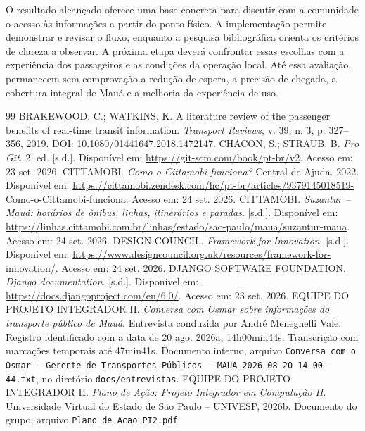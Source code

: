 \documentclass[12pt,oneside,a4paper,brazil]{abntex2}
\begin{document}
O resultado alcançado oferece uma base concreta para discutir com a comunidade o acesso às informações a partir do ponto físico. A implementação permite demonstrar e revisar o fluxo, enquanto a pesquisa bibliográfica orienta os critérios de clareza a observar. A próxima etapa deverá confrontar essas escolhas com a experiência dos passageiros e as condições da operação local. Até essa avaliação, permanecem sem comprovação a redução de espera, a precisão de chegada, a cobertura integral de Mauá e a melhoria da experiência de uso.

\postextual
\begin{thebibliography}{99}
\SingleSpacing
{} BRAKEWOOD, C.; WATKINS, K. A literature review of the passenger benefits of real-time transit information. \textit{Transport Reviews}, v. 39, n. 3, p. 327--356, 2019. DOI: 10.1080/01441647.2018.1472147.
 CHACON, S.; STRAUB, B. \textit{Pro Git}. 2. ed. [s.d.]. Disponível em: \url{https://git-scm.com/book/pt-br/v2}. Acesso em: 23 set. 2026.
 CITTAMOBI. \textit{Como o Cittamobi funciona?} Central de Ajuda. 2022. Disponível em: \url{https://cittamobi.zendesk.com/hc/pt-br/articles/9379145018519-Como-o-Cittamobi-funciona}. Acesso em: 24 set. 2026.
 CITTAMOBI. \textit{Suzantur -- Mauá: horários de ônibus, linhas, itinerários e paradas}. [s.d.]. Disponível em: \url{https://linhas.cittamobi.com.br/linhas/estado/sao-paulo/maua/suzantur-maua}. Acesso em: 24 set. 2026.
 DESIGN COUNCIL. \textit{Framework for Innovation}. [s.d.]. Disponível em: \url{https://www.designcouncil.org.uk/resources/framework-for-innovation/}. Acesso em: 24 set. 2026.
 DJANGO SOFTWARE FOUNDATION. \textit{Django documentation}. [s.d.]. Disponível em: \url{https://docs.djangoproject.com/en/6.0/}. Acesso em: 23 set. 2026.
 EQUIPE DO PROJETO INTEGRADOR II. \textit{Conversa com Osmar sobre informações do transporte público de Mauá}. Entrevista conduzida por André Meneghelli Vale. Registro identificado com a data de 20 ago. 2026a, 14h00min44s. Transcrição com marcações temporais até 47min41s. Documento interno, arquivo \texttt{Conversa com o Osmar - Gerente de Transportes Públicos - MAUA 2026-08-20 14-00-44.txt}, no diretório \texttt{docs/entrevistas}.
 EQUIPE DO PROJETO INTEGRADOR II. \textit{Plano de Ação: Projeto Integrador em Computação II}. Universidade Virtual do Estado de São Paulo -- UNIVESP, 2026b. Documento do grupo, arquivo \texttt{Plano\_de\_Acao\_PI2.pdf}.

\end{thebibliography}
\end{document}
